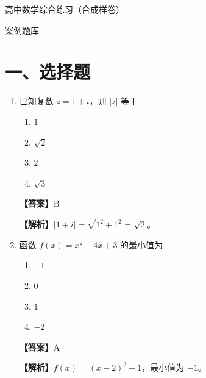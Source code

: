 \documentclass[UTF8,a4paper]{ctexart}
\begin{document}
\begin{center}
{\LARGE 高中数学综合练习（合成样卷）\par}
\medskip
{\large 案例题库}
\end{center}
\vspace{1em}

\section*{一、选择题}


\begin{enumerate}[leftmargin=2em,itemsep=0.8em]


\item 已知复数 $z=1+i$，则 $|z|$ 等于

\begin{enumerate}[label=\Alph*.,itemsep=0.2em,parsep=0pt]

\item $1$

\item $\sqrt{2}$

\item $2$

\item $\sqrt{3}$

\end{enumerate}


\par\noindent\textbf{【答案】}B
\par\noindent\textbf{【解析】}$|1+i|=\sqrt{1^2+1^2}=\sqrt{2}$。



\item 函数 $f(x)=x^2-4x+3$ 的最小值为

\begin{enumerate}[label=\Alph*.,itemsep=0.2em,parsep=0pt]

\item $-1$

\item $0$

\item $1$

\item $-2$

\end{enumerate}


\par\noindent\textbf{【答案】}A
\par\noindent\textbf{【解析】}$f(x)=(x-2)^2-1$，最小值为 $-1$。




\end{enumerate}
\end{document}
